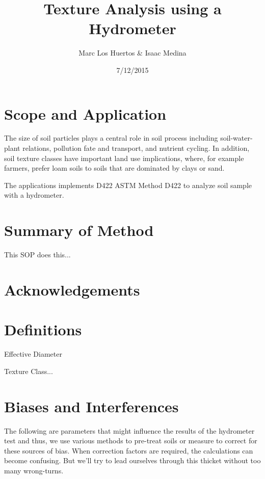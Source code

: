\documentclass[12pt]{../SOP3_alpha}
\title{Texture Analysis using a Hydrometer}
\date{7/12/2015}
\author{Marc Los Huertos \& Isaac Medina}
\begin{document}


\maketitle

\section{Scope and Application}

\NP The size of soil particles plays a central role in soil process including soil-water-plant relations, pollution fate and transport, and nutrient cycling. In addition, soil texture classes have important land use implications, where, for example farmers, prefer loam soils to soils that are dominated by clays or sand.

\NP The applications implements D422 ASTM Method D422 to analyze soil sample with a hydrometer.

\section{Summary of Method}

\NP This SOP does this...

\tableofcontents

\newpage

\section{Acknowledgements}

\section{Definitions}

\NP Effective Diameter

\NP Texture Class...


\section{Biases and Interferences}

\NP The following are parameters that might influence the results of the hydrometer test and thus, we use various methods to pre-treat soils or measure to correct for these sources of bias. When correction factors are required, the calculations can become confusing.	 But we'll try to lead ourselves through this thicket without too many wrong-turns. 
\end{document}
